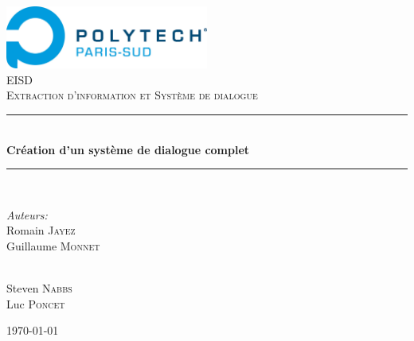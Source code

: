 \newcommand{\HRule}{\rule{\linewidth}{0.5mm}}

\begin{titlepage}
\begin{center}

\includegraphics[width=0.5\textwidth]{polytech}~\\[1cm]

\textsc{\LARGE EISD}\\[1.5cm]

\textsc{\Large Extraction d'information et Système de dialogue}\\[0.5cm]

\HRule \\[0.4cm]
{ \huge \bfseries Création d'un système de dialogue complet\\ [0.4cm] }
\HRule \\[1.5cm]

\begin{minipage}{0.4\textwidth}
\begin{flushleft} \large
\emph{Auteurs:}\\
Romain \textsc{Jayez}\\
Guillaume \textsc{Monnet}
\end{flushleft}
\end{minipage}
\begin{minipage}{0.4\textwidth}
\begin{flushright} \large
\emph{} \\
Steven \textsc{Nabbs}\\
Luc \textsc{Poncet}
\end{flushright}
\end{minipage}

\vfill

{\large \today}

\end{center}
\end{titlepage}
